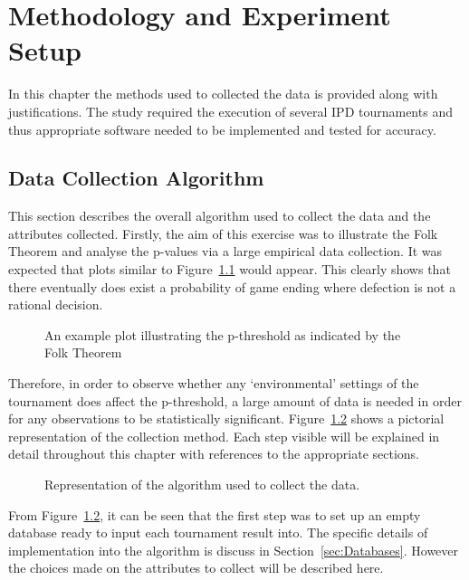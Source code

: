 \chapter{Methodology and Experiment Setup}
In this chapter the methods used to collected the data is provided along with
justifications. The study required the execution of several IPD tournaments and
thus appropriate software needed to be implemented and tested for accuracy.  

\section{Data Collection Algorithm}\label{sec:Data_Collection_Algorithm}
This section describes the overall algorithm used to collect the data and the
attributes collected. Firstly, the aim of this exercise was
to illustrate the Folk Theorem and analyse the p-values via a large empirical
data collection. It was expected that plots similar to Figure~\ref{fig:flk_thm_plt} would
appear. This clearly shows that there eventually does exist a probability of
game ending where defection is not a rational decision.

\begin{figure}
    \centering
    
    \caption{An example plot illustrating the p-threshold as indicated by the Folk Theorem}\label{fig:flk_thm_plt}
\end{figure}

Therefore, in order to observe whether any `environmental' settings of the
tournament does affect the p-threshold, a large amount of data is needed in
order for any observations to be statistically significant. Figure~\ref{fig:alg_diag} shows
a pictorial representation of the collection method. Each step visible will be
explained in detail throughout this chapter with references to the appropriate sections.

\begin{figure}
    \centering
    
    \caption{Representation of the algorithm used to collect the data.}\label{fig:alg_diag}
\end{figure}

From Figure~\ref{fig:alg_diag}, it can be seen that the first step was to set up an empty
database ready to input each tournament result into. 
The specific details of implementation into the algorithm is discuss in
Section~\ref{sec:Databases}. However the choices made on the attributes to
collect will be described here. 

